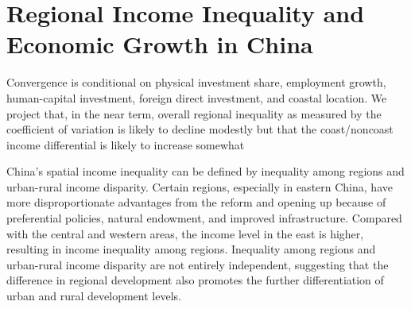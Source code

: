\section{Regional Income Inequality and Economic Growth in China}

Convergence is conditional on physical investment share, employment 
growth, human-capital investment, foreign direct investment, and 
coastal location. We project that, in the near term, overall regional 
inequality as measured by the coefficient of variation is likely to 
decline modestly but that the coast/noncoast income differential is 
likely to increase somewhat~\cite{chen1996regional}

China's spatial income inequality can be defined by inequality 
among regions and urban-rural income disparity. Certain regions, 
especially in eastern China, have more disproportionate advantages 
from the reform and opening up because of preferential policies, 
natural endowment, and improved infrastructure. Compared with the 
central and western areas, the income level in the east is higher, 
resulting in income inequality among regions. Inequality among 
regions and urban-rural income disparity are not entirely 
independent, suggesting that the difference in regional development 
also promotes the further differentiation of urban and rural 
development levels.